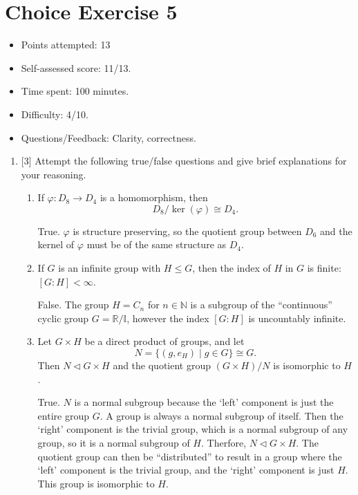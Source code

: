 \documentclass{article}
\newcommand{\R}{\mathbb{R}}
\newcommand{\N}{\mathbb{N}}
\newcommand{\I}{\mathbb{I}}
\newcommand{\normsub}{\lhd}
\begin{document}
\section*{Choice Exercise 5}
\begin{itemize}
  \item Points attempted: 13
  \item Self-assessed score: 11/13.
  \item Time spent: 100 minutes.
  \item Difficulty: 4/10.
  \item Questions/Feedback: Clarity, correctness.
\end{itemize}
\begin{enumerate}
    \item {
        [3] Attempt the following true/false questions and give brief explanations for your reasoning.
      
        \begin{enumerate}
            \item {
                If \(\varphi \colon D_8 \to D_4\)  is a homomorphism, then \[           D_8/\ker(\varphi) \cong D_4.         \]

                True. \(\varphi\) is structure preserving, so the quotient group 
                between \(D_6\) and the kernel of \(\varphi\) must be of the 
                same structure as \(D_4\).
            }

            \item {
                If \(G\) is an infinite group with \(H \leq G\), then the index of \(H\) in \(G\) is finite: \([G:H] < \infty\).
        
                False. The group \(H = C_n\) for \(n \in \N\) is a subgroup of the ``continuous''
                cyclic group \(G = \R / \I\), however the index \([ G \colon H]\)
                is uncountably infinite.
            }

            \item {
                Let \(G \times H\) be a direct product of groups, and let \[             N = \{(g, e_H) \mid g \in G\} \cong G.           \] Then \(N \triangleleft G \times H\) and the quotient group \((G \times H)/N\) is isomorphic to \(H\).
        
                True. \(N\) is a normal subgroup because the `left' component 
                is just the entire group \(G\). A group is always a normal 
                subgroup of itself. Then the `right' component is the trivial group,
                which is a normal subgroup of any group, so it is a normal 
                subgroup of \(H\). Therfore, \(N \normsub G \times H\). The quotient
                group can then be ``distributed'' to result in a group where the 
                `left' component is the trivial group, and the `right' component 
                is just \(H\). This group is isomorphic to \(H\).
            }


\end{enumerate}}
\end{enumerate}
\end{document}
